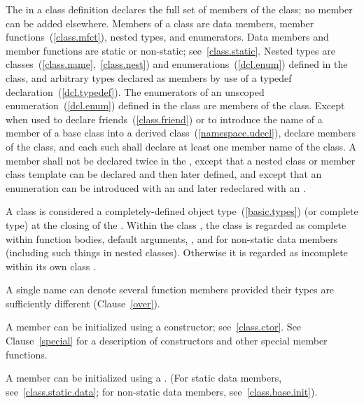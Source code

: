 \pnum
{}%
The  in a class definition declares the
full set of members of the class; no member can be added elsewhere.
Members of a class are data members, member
functions~(\ref{class.mfct}), nested types, and enumerators. Data
members and member functions are static or non-static;
see~\ref{class.static}. Nested types are
classes~(\ref{class.name},~\ref{class.nest}) and
enumerations~(\ref{dcl.enum}) defined in the class, and arbitrary types
declared as members by use of a typedef declaration~(\ref{dcl.typedef}).
The enumerators of an unscoped enumeration~(\ref{dcl.enum}) defined in the class
are members of the class. Except when used to declare
friends~(\ref{class.friend}) or to introduce the name of a member of a
base class into a derived
class~(\ref{namespace.udecl}),
 declare members of the class, and each
such  shall declare at least one member
name of the class. A member shall not be declared twice in the
, except that a nested class or member
class template can be declared and then later defined, and except that an
enumeration can be introduced with an  and later
redeclared with an .

\pnum
{}%
A class is considered a completely-defined object
type~(\ref{basic.types}) (or complete type) at the closing \tcode{\}} of
the .
Within the class
, the class is regarded as complete
within function bodies, default arguments,
, and
 for non-static data members
(including such things in nested classes).
Otherwise it is regarded as incomplete within its own class
.

\pnum
\enternote
A single name can denote several function members provided their types
are sufficiently different (Clause~\ref{over}).
\exitnote

\pnum
A member can be initialized using a constructor; see~\ref{class.ctor}.
\enternote
See Clause~\ref{special} for a description of constructors and other
special member functions.
\exitnote

\pnum
A member can be initialized using a . (For static data members, see~\ref{class.static.data}; for non-static data members, see~\ref{class.base.init}).

